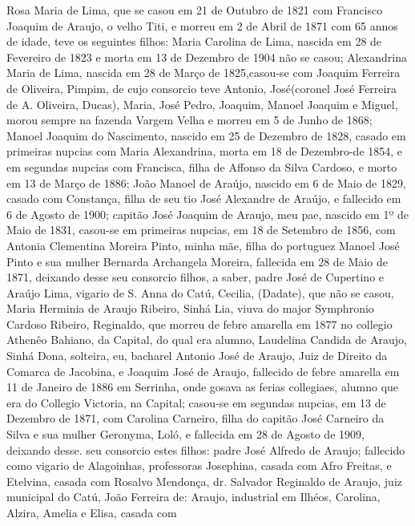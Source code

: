 Rosa Maria de Lima, que se casou em 21 de Outubro de 1821 com Francisco Joaquim de Araujo, o velho Titi, e morreu em 2 de Abril de 1871 com 65 annos de idade, teve os seguintes filhos: Maria Carolina de Lima, nascida em 28 de Fevereiro de 1823 e morta em 13 de Dezembro de 1904 não se casou; Alexandrina Maria de Lima, nascida em 28 de Março de 1825,casou-se com Joaquim Ferreira de Oliveira, Pimpim, de cujo consorcio teve Antonio, José(coronel José Ferreira de A. Oliveira, Ducas), Maria, José Pedro, Joaquim, Manoel Joaquim e Miguel, morou sempre na fazenda Vargem Velha e morreu em 5 de Junho de 1868; Manoel Joaquim do Nascimento, nascido em 25 de Dezembro de 1828, casado em primeiras nupcias com Maria Alexandrina, morta em 18 de Dezembro-de 1854, e em segundas nupcias com Francisca, filha de Affonso da Silva Cardoso, e morto em 13 de Março de 1886; João Manoel de Araújo, nascido em 6 de Maio de 1829, casado com Constança, filha de seu tio José Alexandre de Araújo, e fallecido em 6 de Agosto de 1900; capitão José Joaquim de Araujo, meu pae, nascido em 1º de Maio de 1831, casou-se em primeiras nupcias, em 18 de Setembro de 1856, com Antonia Clementina Moreira Pinto, minha mãe, filha do portuguez Manoel José Pinto e sua mulher Bernarda Archangela Moreira, fallecida em 28 de Maio de 1871, deixando desse seu consorcio filhos, a saber, padre José de Cupertino e Araújo Lima, vigario de S. Anna do Catú, Cecilia, (Dadate), que não se casou, Maria Herminia de Araujo Ribeiro, Sinhá Lia, viuva do major Symphronio Cardoso Ribeiro, Reginaldo, que morreu de febre amarella em 1877 no collegio Athenêo Bahiano, da Capital, do qual era alumno, Laudelina Candida de Araujo, Sinhá Dona, solteira, eu, bacharel Antonio José de Araujo, Juiz de Direito da Comarca de Jacobina, e Joaquim José de Araujo, fallecido de febre amarella em 11 de Janeiro de 1886 em Serrinha, onde gosava as ferias collegiaes, alumno que era do Collegio Victoria, na Capital; casou-se em segundas nupcias, em 13 de Dezembro de 1871, com Carolina Carneiro, filha do capitão José Carneiro da Silva e sua mulher Geronyma, Loló, e fallecida em 28 de Agosto de 1909, deixando desse. seu consorcio estes filhos: padre José Alfredo de Araujo; fallecido como vigario de Alagoinhas, professoras Josephina, casada com Afro Freitas, e Etelvina, casada com Rosalvo Mendonça, dr. Salvador Reginaldo de Araujo, juiz municipal do Catú, João Ferreira de: Araujo, industrial em Ilhéos, Carolina, Alzira, Amelia e Elisa, casada com
